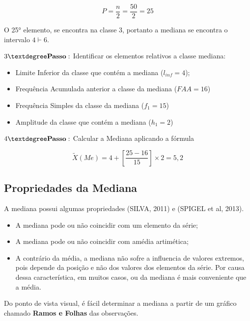 $$ P=\frac{n}{2}=\frac{50}{2}=25 $$

O 25° elemento, se encontra na classe 3, portanto a mediana se encontra o intervalo $ 4 \vdash 6$.

\vskip0.3cm

$3° \mbox{\textbf{Passo}}:$ Identificar os elementos relativos a classe mediana:

\begin{itemize}
  \item Limite Inferior da classe que contém a mediana ($l_{inf}=4$);
  \item Frequência Acumulada anterior a classe da mediana ($FAA=16$)
  \item Frequência Simples da classe da mediana ($f_{1}=15$)
  \item Amplitude da classe que contém a mediana ($h_{1}=2$)
\end{itemize}

$4° \mbox{\textbf{Passo}}:$ Calcular a Mediana aplicando a fórmula


\begin{equation}\label{}
    \tilde{X}(Me)= 4+\left[\frac{25-16}{15}\right]\times 2 = 5,2
\end{equation}






\newpage

\subsection{Propriedades da Mediana}

A mediana possui algumas propriedades (SILVA, 2011) e (SPIGEL et al, 2013).

\begin{itemize}
\item A mediana pode ou não coincidir com um elemento da série;
\item A mediana pode ou não coincidir com amédia artimética;
\item A contrário da média, a mediana não sofre a influencia de valores extremos, pois depende da posição e não dos valores dos elementos da série. Por causa dessa característica, em muitos casos, ou da mediana é mais conveniente que a média.    
\end{itemize}


Do ponto de vista visual, é fácil determinar a mediana a partir de um gráfico chamado \textbf{Ramos e Folhas} das observações.




